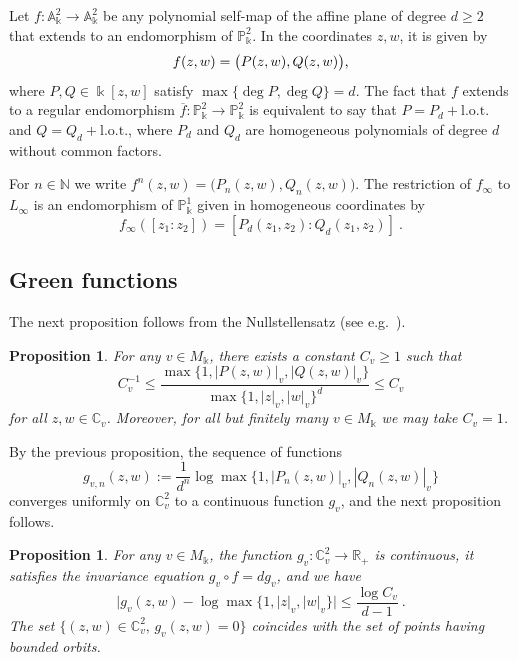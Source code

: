 \documentclass[11 pt, oneside, a4paper]{amsart}
\newcommand{\R}{\mathbb{R}}
\newcommand{\C}{\mathbb{C}}
\newcommand{\N}{\mathbb{N}}
\newcommand{\nA}{\mathbb{A}}
\newcommand{\nP}{\mathbb{P}}
\newcommand{\nk}{\Bbbk}
\newtheorem{prop}[thm]{Proposition}
\theoremstyle{definition}
\theoremstyle{definition}
\begin{document}
Let $f \colon \nA_\nk^2 \to \nA_\nk^2$ be any polynomial self-map of the affine plane of degree $d \geq 2$
that extends to an endomorphism of $\nP_\nk^2$. In the coordinates $z,w$, it is 
given by
\[
f(z,w)=\big(P(z,w),Q(z,w)\big)\text,
\]
where $P,Q \in \nk[z,w]$ satisfy $\max\{\deg P, \deg Q\}=d$.
The fact that $f$ extends to a regular endomorphism $\overline{f} \colon \nP_\nk^2\to \nP_\nk^2$ is equivalent to say that 
$P=P_d + \text{l.o.t.}$ and $Q=Q_d + \text{l.o.t.}$, 
where $P_d$ and $Q_d$ are homogeneous polynomials of degree $d$ without common factors.

For $n\in \N$ we write 
$f^n(z,w)=\big(P_n(z,w),Q_n(z,w)\big)$.
The restriction of $f_\infty$ to $L_\infty$ is an endomorphism of $\nP^1_\nk$
given in homogeneous coordinates by
\[f_\infty([z_1:z_2])= [P_d(z_1,z_2):Q_d(z_1,z_2)]~.\]



\subsection{Green functions}\label{sec:local green} 
The next proposition follows from the Nullstellensatz (see e.g.~\cite[Theorem 3.11]{silverman:arithdynsys}).
\begin{prop}
For any $v\in M_\nk$, there exists a constant $C_v \ge 1$ such that 
\begin{equation}\label{eq:stand}
C_v^{-1}
\le
\frac{ \max\{1,|P(z,w)|_v,|Q(z,w)|_v\}}
{\max\{1,|z|_v,|w|_v\}^d}
\le
C_v
\end{equation}
for all $z,w \in \C_v$. 
Moreover, for all but finitely many $v\in M_\nk$ we may take $C_v = 1$.
\end{prop}
By the previous proposition, the sequence of functions
\[g_{v,n}(z,w):= \frac1{d^n}\log  \max\{1,|P_n(z,w)|_v, |Q_n(z,w)|_v\}\]
converges uniformly on $\C^2_v$ to a continuous function $g_v$, and
the next proposition follows. 
\begin{prop}\label{prop:green}
For any $v\in M_\nk$, the function $g_v \colon \C_v^2 \to \R_+$
is continuous, it satisfies the invariance equation
$g_v \circ f = d g_v$, and we have
\[
\big| g_v(z,w) - \log \max\{1,|z|_v,|w|_v\} \big| \le \frac{\log C_v}{d-1}
~.\]
The set $\{(z,w) \in \C_v^2,\, g_v(z,w)=0\}$ coincides with the set of points having bounded orbits.
\end{prop}
\end{document}
